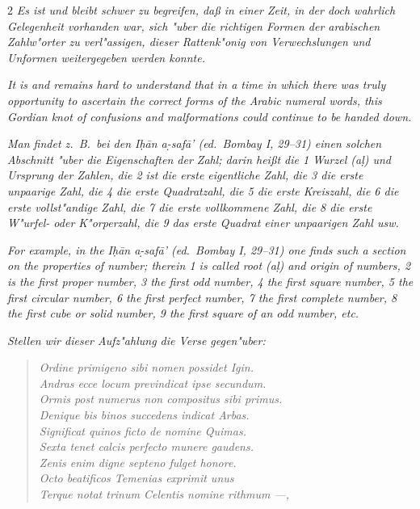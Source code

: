\documentclass[10pt,a4paper]{article}
\newcommand{\s}[1]{\d{#1}}
\newcommand{\hw}{\d{h}}
\begin{document}
\begin{paracol}{2}
\textit{Es ist und bleibt schwer zu begreifen, da\ss{} in einer Zeit, in der doch wahrlich Gelegenheit vorhanden war, sich "uber die richtigen Formen der arabischen Zahlw"orter zu verl"assigen, dieser Rattenk"onig von Verwechslungen und Unformen weitergegeben werden konnte.}

\switchcolumn

\textit{It is and remains hard to understand that in a time in which there was truly opportunity to ascertain the correct forms of the Arabic numeral words, this Gordian knot of confusions and malformations could continue to be handed down.}

\switchcolumn*

\textit{Man findet z.\ B.\ bei den I\hw{}\=an a\s-s{}af\=a' (ed.\ Bombay I, 29--31) einen solchen Abschnitt "uber die Eigenschaften der Zahl; darin hei\ss{}t die 1 \textit{Wurzel (a\s{l})} und Ursprung der Zahlen, die 2 ist die erste eigentliche Zahl, die 3 die erste unpaarige Zahl, die 4 die erste Quadratzahl, die 5 die erste Kreiszahl, die 6 die erste vollst"andige Zahl, die 7 die erste vollkommene Zahl, die 8 die erste W"urfel- oder K"orperzahl, die 9 das erste Quadrat einer unpaarigen Zahl usw.}

\switchcolumn

\textit{For example, in the I\hw{}\=an a\s-s{}af\=a' (ed.\ Bombay I, 29--31) one finds such a section on the properties of number; therein 1 is called \textit{root (a\s{l})} and origin of numbers, 2 is the first proper number, 3 the first odd number, 4 the first square number, 5 the first circular number, 6 the first perfect number, 7 the first complete number, 8 the first cube or solid number, 9 the first square of an odd number, etc.}

\switchcolumn*

\textit{Stellen wir dieser Aufz"ahlung die Verse gegen"uber:}

\begin{quote}
\textit{Ordine primigeno sibi nomen possidet Igin.}\\
\textit{Andras ecce locum previndicat ipse secundum.}\\
\textit{Ormis post numerus non compositus sibi primus.}\\
\textit{Denique bis binos succedens indicat Arbas.}\\
\textit{Significat quinos ficto de nomine Quimas.}\\
\textit{Sexta tenet calcis perfecto munere gaudens.}\\
\textit{Zenis enim digne septeno fulget honore.}\\
\textit{Octo beatificos Temenias exprimit unus}\\
\textit{Terque notat trinum Celentis nomine rithmum ---,}
\end{quote}


\end{paracol}
\end{document}
